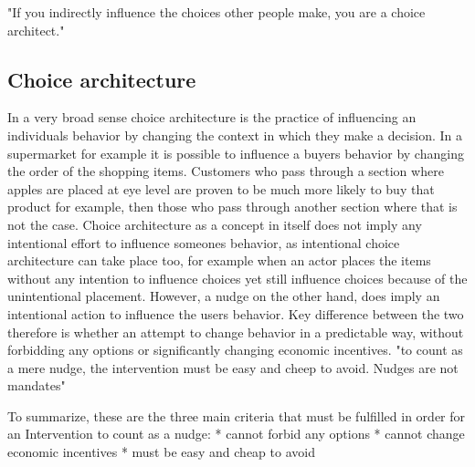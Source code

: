 "If you indirectly influence the choices other people make, you are a choice architect." \~\cite[ch. 1.5, p. 3]{Thaler2008}

\subsection{Choice architecture}
In a very broad sense choice architecture is the practice of influencing an individuals behavior by changing the context in which they make a decision. In a supermarket for example it is possible to influence a buyers behavior by changing the order of the shopping items. Customers who pass through a section where apples are placed at eye level are proven to be much more likely to buy that product for example, then those who pass through another section where that is not the case. Choice architecture as a concept in itself does not imply any intentional effort to influence someones behavior, as intentional choice architecture can take place too, for example when an actor places the items without any intention to influence choices yet still influence choices because of the unintentional placement.
However, a  nudge on the other hand, does imply an intentional action to influence the users behavior. Key difference between the two therefore is whether an attempt to change behavior in a predictable way, without forbidding any options or significantly changing economic incentives. "to count as a mere nudge, the intervention must be easy and cheep to avoid. Nudges are not mandates"

To  summarize, these are the three main criteria that must be fulfilled in order for an Intervention to count as a nudge:
* cannot forbid any options
* cannot change economic incentives
* must be easy and cheap to avoid
